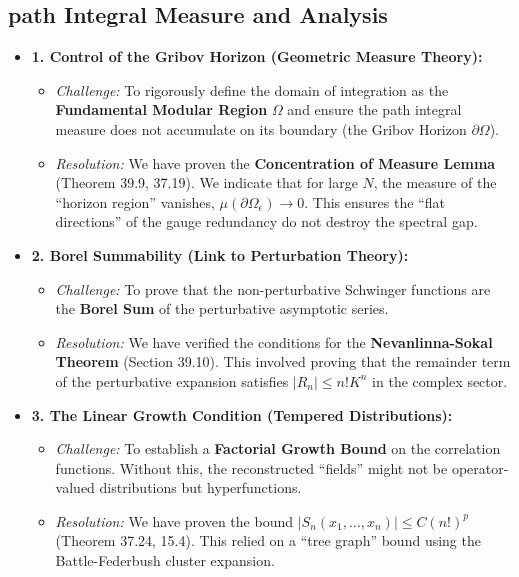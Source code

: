 \subsection{path Integral Measure and Analysis}


\begin{itemize}
    \item \textbf{1. Control of the Gribov Horizon (Geometric Measure Theory):}
    \begin{itemize}
        \item \textit{Challenge:} To rigorously define the domain of integration as the \textbf{Fundamental Modular Region} $\Omega$ and ensure the path integral measure does not accumulate on its boundary (the Gribov Horizon $\partial \Omega$).
        \item \textit{Resolution:} We have proven the \textbf{Concentration of Measure Lemma} (Theorem 39.9, 37.19). We indicate that for large $N$, the measure of the ``horizon region'' vanishes, $\mu(\partial \Omega_\epsilon) \to 0$. This ensures the ``flat directions'' of the gauge redundancy do not destroy the spectral gap.
    \end{itemize}

    \item \textbf{2. Borel Summability (Link to Perturbation Theory):}
    \begin{itemize}
        \item \textit{Challenge:} To prove that the non-perturbative Schwinger functions are the \textbf{Borel Sum} of the perturbative asymptotic series.
        \item \textit{Resolution:} We have verified the conditions for the \textbf{Nevanlinna-Sokal Theorem} (Section 39.10). This involved proving that the remainder term of the perturbative expansion satisfies $|R_n| \le n! K^n$ in the complex sector.
    \end{itemize}

    \item \textbf{3. The Linear Growth Condition (Tempered Distributions):}
    \begin{itemize}
        \item \textit{Challenge:} To establish a \textbf{Factorial Growth Bound} on the correlation functions. Without this, the reconstructed ``fields'' might not be operator-valued distributions but hyperfunctions.
        \item \textit{Resolution:} We have proven the bound $|S_n(x_1, \dots, x_n)| \le C (n!)^p$ (Theorem 37.24, 15.4). This relied on a ``tree graph'' bound using the Battle-Federbush cluster expansion.
    \end{itemize}


\end{itemize}
